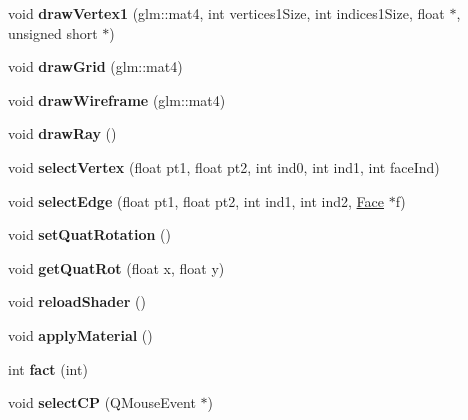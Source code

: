 \begin{DoxyCompactItemize}
\item 
\hypertarget{class_my_g_l_widget_a4b14007fb4f3f3263d41e7b3bd282f49}{void {\bfseries draw\-Vertex1} (glm\-::mat4, int vertices1\-Size, int indices1\-Size, float $\ast$, unsigned short $\ast$)}\label{class_my_g_l_widget_a4b14007fb4f3f3263d41e7b3bd282f49}

\item 
\hypertarget{class_my_g_l_widget_a6d30a932f1b4adbc242a06c66cd523fd}{void {\bfseries draw\-Grid} (glm\-::mat4)}\label{class_my_g_l_widget_a6d30a932f1b4adbc242a06c66cd523fd}

\item 
\hypertarget{class_my_g_l_widget_a97d38928d94809e32cb702cbdb8bfa59}{void {\bfseries draw\-Wireframe} (glm\-::mat4)}\label{class_my_g_l_widget_a97d38928d94809e32cb702cbdb8bfa59}

\item 
\hypertarget{class_my_g_l_widget_aa949ca163ab0a5c841bec8f18188f719}{void {\bfseries draw\-Ray} ()}\label{class_my_g_l_widget_aa949ca163ab0a5c841bec8f18188f719}

\item 
\hypertarget{class_my_g_l_widget_adaa59ab09d6646908fa42afa8cc2582f}{void {\bfseries select\-Vertex} (float pt1, float pt2, int ind0, int ind1, int face\-Ind)}\label{class_my_g_l_widget_adaa59ab09d6646908fa42afa8cc2582f}

\item 
\hypertarget{class_my_g_l_widget_a65dd63d95730782ac474ddf4c42c76d3}{void {\bfseries select\-Edge} (float pt1, float pt2, int ind1, int ind2, \hyperlink{class_face}{Face} $\ast$f)}\label{class_my_g_l_widget_a65dd63d95730782ac474ddf4c42c76d3}

\item 
\hypertarget{class_my_g_l_widget_a75b5ec2f9c68a5930188d6ce6df43764}{void {\bfseries set\-Quat\-Rotation} ()}\label{class_my_g_l_widget_a75b5ec2f9c68a5930188d6ce6df43764}

\item 
\hypertarget{class_my_g_l_widget_aba3bf49d17e6c3bd4d3a4f167a51a98d}{void {\bfseries get\-Quat\-Rot} (float x, float y)}\label{class_my_g_l_widget_aba3bf49d17e6c3bd4d3a4f167a51a98d}

\item 
\hypertarget{class_my_g_l_widget_a40597615fd666fdfc1d71bd6154f8113}{void {\bfseries reload\-Shader} ()}\label{class_my_g_l_widget_a40597615fd666fdfc1d71bd6154f8113}

\item 
\hypertarget{class_my_g_l_widget_a94fe42c37ccc63a6e3607c1cba369b0f}{void {\bfseries apply\-Material} ()}\label{class_my_g_l_widget_a94fe42c37ccc63a6e3607c1cba369b0f}

\item 
\hypertarget{class_my_g_l_widget_a13e832157a11d240cd3c28dfa7ce22bc}{int {\bfseries fact} (int)}\label{class_my_g_l_widget_a13e832157a11d240cd3c28dfa7ce22bc}

\item 
\hypertarget{class_my_g_l_widget_ae28affd7ff80696837be7c46666e0311}{void {\bfseries select\-C\-P} (Q\-Mouse\-Event $\ast$)}\label{class_my_g_l_widget_ae28affd7ff80696837be7c46666e0311}

\end{DoxyCompactItemize}
